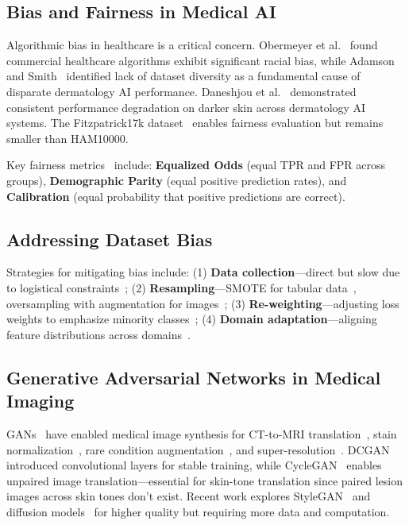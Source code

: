 \documentclass[10pt, twocolumn, letterpaper]{article}
\begin{document}
\subsection{Bias and Fairness in Medical AI}
Algorithmic bias in healthcare is a critical concern. Obermeyer et al.~\cite{obermeyer2019} found commercial healthcare algorithms exhibit significant racial bias, while Adamson and Smith~\cite{adamson2018} identified lack of dataset diversity as a fundamental cause of disparate dermatology AI performance. Daneshjou et al.~\cite{daneshjou2022} demonstrated consistent performance degradation on darker skin across dermatology AI systems. The Fitzpatrick17k dataset~\cite{groh2021} enables fairness evaluation but remains smaller than HAM10000.

Key fairness metrics~\cite{hardt2016} include: \textbf{Equalized Odds} (equal TPR and FPR across groups), \textbf{Demographic Parity} (equal positive prediction rates), and \textbf{Calibration} (equal probability that positive predictions are correct).

\subsection{Addressing Dataset Bias}
Strategies for mitigating bias include: (1) \textbf{Data collection}---direct but slow due to logistical constraints~\cite{codella2018}; (2) \textbf{Resampling}---SMOTE for tabular data~\cite{chawla2002}, oversampling with augmentation for images~\cite{wong2016}; (3) \textbf{Re-weighting}---adjusting loss weights to emphasize minority classes~\cite{cui2019}; (4) \textbf{Domain adaptation}---aligning feature distributions across domains~\cite{ganin2016}.

\subsection{Generative Adversarial Networks in Medical Imaging}
GANs~\cite{goodfellow2014} have enabled medical image synthesis for CT-to-MRI translation~\cite{wolterink2017}, stain normalization~\cite{shaban2019}, rare condition augmentation~\cite{frid2018}, and super-resolution~\cite{mahapatra2019}. DCGAN~\cite{radford2015} introduced convolutional layers for stable training, while CycleGAN~\cite{zhu2017} enables unpaired image translation---essential for skin-tone translation since paired lesion images across skin tones don't exist. Recent work explores StyleGAN~\cite{karras2019} and diffusion models~\cite{ho2020} for higher quality but requiring more data and computation.
\end{document}
